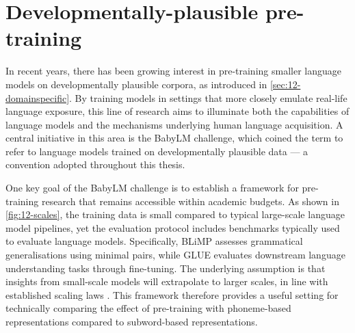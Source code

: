 \section{Developmentally-plausible pre-training}\label{sec:12-plausiblepretraining}




In recent years, there has been growing interest in pre-training smaller language models on developmentally plausible corpora, as introduced in \cref{sec:12-domainspecific}. By training models in settings that more closely emulate real-life language exposure, this line of research aims to illuminate both the capabilities of language models and the mechanisms underlying human language acquisition. A central initiative in this area is the BabyLM challenge, which coined the term  to refer to language models trained on developmentally plausible data --- a convention adopted throughout this thesis.

One key goal of the BabyLM challenge is to establish a framework for pre-training research that remains accessible within academic budgets. As shown in \cref{fig:12-scales}, the training data is small compared to typical large-scale language model pipelines, yet the evaluation protocol includes benchmarks typically used to evaluate language models. Specifically, BLiMP assesses grammatical generalisations using minimal pairs, while GLUE evaluates downstream language understanding tasks through fine-tuning. The underlying assumption is that insights from small-scale models will extrapolate to larger scales, in line with established scaling laws \citep{kaplan2020scaling}. This framework therefore provides a useful setting for technically comparing the effect of pre-training with phoneme-based representations compared to subword-based representations.


